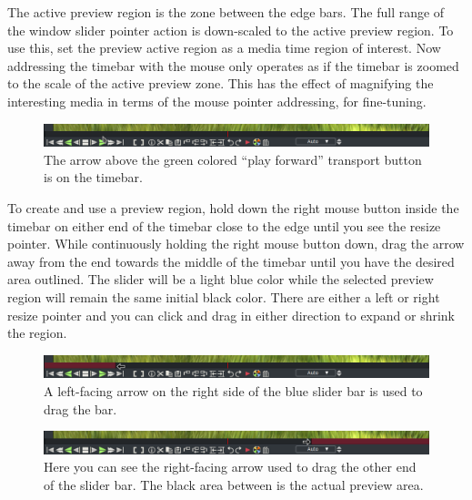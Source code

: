 The active preview region is the zone between the edge bars.  
The full range of the window slider pointer action is down-scaled to the active preview region.   
To use this, set the preview active region as a media time region of interest.  
Now addressing the timebar with the mouse only operates as if the timebar is zoomed to the scale of the active preview zone.  
This has the effect of magnifying the interesting media in terms of the mouse pointer addressing, for fine-tuning.

\begin{figure}[htpb]
    \centering
    \includegraphics[width=0.8\linewidth]{images/timebar1.png}
    \caption{The arrow above the green colored “play forward” transport button is on the timebar.}
    \label{fig:timebar1}
\end{figure}

To create and use a preview region, hold down the right mouse button inside the timebar on either end of the timebar close to the edge until you see the resize pointer.  
While continuously holding the right mouse button down, drag the arrow away from the end towards the middle of the timebar until you have the desired area outlined.  
The slider will be a light blue color while the selected preview region will remain the same initial black color.  
There are either a left or right resize pointer and you can click and drag in either direction to expand or shrink the region.

\begin{figure}[htpb]
    \centering
    \includegraphics[width=0.8\linewidth]{images/timebar2.png}
    \caption{ A left-facing arrow on the right side of the blue slider bar is used to drag the bar.}
    \label{fig:timebar2}
\end{figure}

\begin{figure}[htpb]
    \centering
    \includegraphics[width=0.8\linewidth]{images/timebar3.png}
    \caption{Here you can see the right-facing arrow used to drag the other end of the slider bar.  
        The black area between is the actual preview area.}
    \label{fig:timebar3}
\end{figure}

